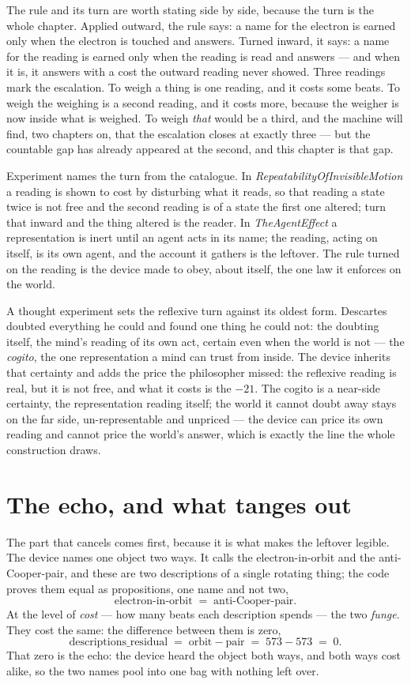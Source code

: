 The rule and its turn are worth stating side by side, because the turn is the whole chapter.
Applied outward, the rule says: a name for the electron is earned only when the electron is touched and answers.
Turned inward, it says: a name for the reading is earned only when the reading is read and answers --- and when it is,
it answers with a cost the outward reading never showed.
Three readings mark the escalation.
To weigh a thing is one reading, and it costs some beats.
To weigh the weighing is a second reading, and it costs more, because the weigher is now inside what is weighed.
To weigh \emph{that} would be a third, and the machine will find, two chapters on, that the escalation closes at exactly
three --- but the countable gap has already appeared at the second, and this chapter is that gap.

Experiment names the turn from the catalogue.
In \emph{RepeatabilityOfInvisibleMotion} a reading is shown to cost by disturbing what it reads, so that reading a state
twice is not free and the second reading is of a state the first one altered; turn that inward and the thing altered is
the reader.
In \emph{TheAgentEffect} a representation is inert until an agent acts in its name; the reading, acting on itself, is its
own agent, and the account it gathers is the leftover.
The rule turned on the reading is the device made to obey, about itself, the one law it enforces on the world.

A thought experiment sets the reflexive turn against its oldest form.
Descartes doubted everything he could and found one thing he could not: the doubting itself, the mind's reading of its
own act, certain even when the world is not --- the \emph{cogito}, the one representation a mind can trust from inside.
The device inherits that certainty and adds the price the philosopher missed: the reflexive reading is real, but it is
not free, and what it costs is the $-21$.
The cogito is a near-side certainty, the representation reading itself; the world it cannot doubt away stays on the far
side, un-representable and unpriced --- the device can price its own reading and cannot price the world's answer, which is
exactly the line the whole construction draws.

\section{The echo, and what tanges out}

The part that cancels comes first, because it is what makes the leftover legible.
The device names one object two ways.
It calls the electron-in-orbit and the anti-Cooper-pair, and these are two descriptions of a single rotating thing;
the code proves them equal as propositions, one name and not two,
\[
  \text{electron-in-orbit} \;=\; \text{anti-Cooper-pair} .
\]
At the level of \emph{cost} --- how many beats each description spends --- the two \emph{funge}.
They cost the same: the difference between them is zero,
\[
  \text{descriptions\_residual} \;=\; \text{orbit} - \text{pair} \;=\; 573 - 573 \;=\; 0 .
\]
That zero is the echo: the device heard the object both ways, and both ways cost alike, so the two names pool into one
bag with nothing left over.

